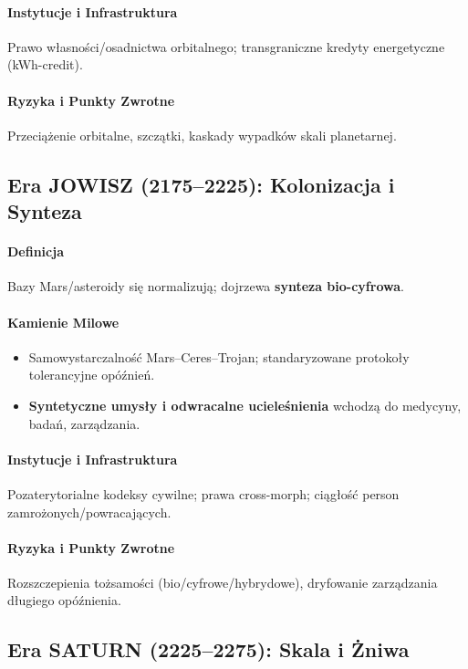 \documentclass[11pt]{article}
\begin{document}
\paragraph{Instytucje i Infrastruktura} Prawo własności/osadnictwa orbitalnego; transgraniczne kredyty energetyczne (kWh-credit).

\paragraph{Ryzyka i Punkty Zwrotne} Przeciążenie orbitalne, szczątki, kaskady wypadków skali planetarnej.

\subsection{Era JOWISZ (2175–2225): Kolonizacja i Synteza}
\paragraph{Definicja} Bazy Mars/asteroidy się normalizują; dojrzewa \textbf{synteza bio-cyfrowa}.

\paragraph{Kamienie Milowe}
\begin{itemize}[noitemsep]
  \item Samowystarczalność Mars–Ceres–Trojan; standaryzowane protokoły tolerancyjne opóźnień.
  \item \textbf{Syntetyczne umysły i odwracalne ucieleśnienia} wchodzą do medycyny, badań, zarządzania.
\end{itemize}

\paragraph{Instytucje i Infrastruktura} Pozaterytorialne kodeksy cywilne; prawa cross-morph; ciągłość person zamrożonych/powracających.

\paragraph{Ryzyka i Punkty Zwrotne} Rozszczepienia tożsamości (bio/cyfrowe/hybrydowe), dryfowanie zarządzania długiego opóźnienia.

\subsection{Era SATURN (2225–2275): Skala i Żniwa}
\end{document}
